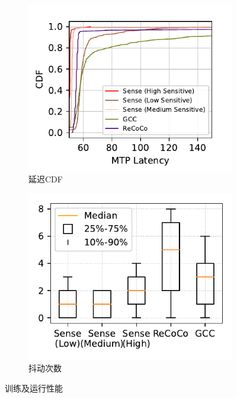\begin{figure}[ht]
\vspace{-0.1cm} %

\begin{subfigure}[t]{0.4\linewidth}
  \centering
  \includegraphics[width=\linewidth]{figures/chap03/evaluation_plots/cdf_delay.pdf}
  \caption{延迟CDF}
  \label{fig-latency-cdf}
\end{subfigure}%
\hspace{0.02\linewidth} %
\begin{subfigure}[t]{0.4\linewidth}
  \centering
  \includegraphics[width=\linewidth]{figures/chap03/evaluation_plots/jitter_times.pdf}
  \caption{抖动次数}
  \label{fig-jitter-times}
\end{subfigure}

\caption{训练及运行性能}
\label{fig-evaluation-result}
\end{figure}
